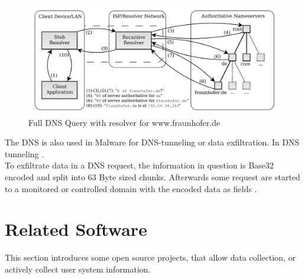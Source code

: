         
        
        
        \begin{figure}
            \centering
            \includegraphics[width=\textwidth]{latex/figures/dns_query.jpg}
            \caption[Full DNS Query with resolver for www.fraunhofer.de]{Full DNS Query with resolver for                 www.fraunhofer.de \cite{friedewald_privacy_2018}}
            \label{fig:dns_query}
        \end{figure}
        
        
        The DNS is also used in Malware for DNS-tunneling or data exfiltration.
        In DNS tunneling  \cite{das_detection_2017}.\\
        To exfiltrate data in a DNS request, the information in question is Base32 encoded and split into 63 Byte sized chunks. Afterwards some request are started to a monitored or controlled domain with the encoded data as fields \cite{mertens_infosec_2017}.\\
        
\newpage
\section{Related Software}
    \label{sec:related:related_sw}
    This section introduces some open source projects, that allow data collection, or actively collect user system information. 
    

